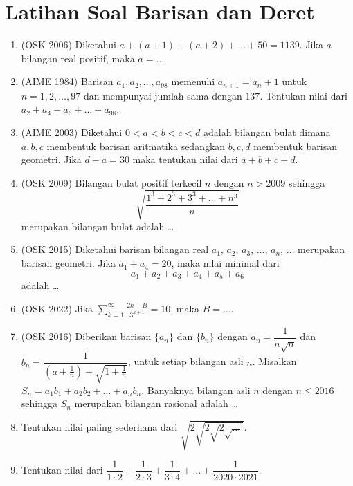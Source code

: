 \documentclass[12pt]{scrartcl}
\begin{document}
\section{Latihan Soal Barisan dan Deret}
\begin{enumerate}
\item (OSK 2006) Diketahui $a+(a+1)+(a+2)+\dots+50=1139$. Jika $a$ bilangan real positif, maka $a=\dots$

\item (AIME 1984) Barisan $a_1,a_2,\dots,a_{98}$ memenuhi $a_{n+1}=a_n+1$ untuk $n=1,2,\dots,97$ dan mempunyai jumlah sama dengan $137$. Tentukan nilai dari $a_2+a_4+a_6+\dots+a_{98}$.

\item (AIME 2003) Diketahui $0<a<b<c<d$ adalah bilangan bulat dimana $a,b,c$ membentuk barisan aritmatika sedangkan $b,c,d$ membentuk barisan geometri. Jika $d-a=30$ maka tentukan nilai dari $a+b+c+d$.

\item (OSK 2009) Bilangan bulat positif terkecil $n$ dengan $n> 2009$ sehingga $$\sqrt{\dfrac{1^3+2^3+3^3+\dots+n^3}{n}}$$
merupakan bilangan bulat adalah \dots

\item (OSK 2015) Diketahui barisan bilangan real $a_1$, $a_2$, $a_3$, $\dots$, $a_n$, $\dots$ merupakan barisan geometri. Jika $a_1+a_4 = 20$, maka nilai minimal dari
\[a_1 + a_2 + a_3 + a_4 + a_5 + a_6\]
adalah \ldots

\item (OSK 2022) Jika $\displaystyle\sum_{k=1}^{\infty} \frac{2k + B}{3^{k+1}} = 10$, maka $B = \ldots $.

\item (OSK 2016) Diberikan barisan $\{a_n\}$ dan $\{b_n\}$ dengan $a_n = \dfrac{1}{n\sqrt{n}}$ dan $b_n = \dfrac{1}{\left(a+\frac{1}{n}\right)+\sqrt{1+\frac{1}{n}}}$, untuk setiap bilangan asli $n$. Misalkan $S_n = a_1b_1 + a_2b_2 + \ldots + a_nb_n$. Banyaknya
bilangan asli $n$ dengan $n \le 2016$ sehingga $S_n$ merupakan bilangan rasional adalah \ldots 

\item Tentukan nilai paling sederhana dari $\sqrt{2\sqrt{2\sqrt{2\sqrt{\dots}}}}$.

\item Tentukan nilai dari $\dfrac{1}{1\cdot2}+\dfrac{1}{2\cdot 3}+\dfrac{1}{3 \cdot 4}+\dots+\dfrac{1}{2020 \cdot 2021}.$


\end{enumerate}
\end{document}
